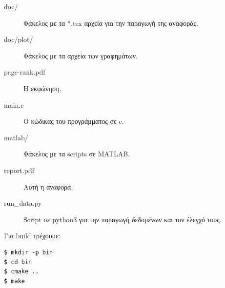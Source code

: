 \begin{description}
	\item[doc/] Φάκελος με τα *.tex αρχεία για την παραγωγή της αναφοράς.
	\item[doc/plot/] Φάκελος με τα αρχεία των γραφημάτων.
	\item[page-rank.pdf] Η εκφώνηση.
	\item[main.c] Ο κώδικας του προγράμματος σε c.
	\item[matlab/] Φάκελος με τα scripts σε MATLAB.
	\item[report.pdf] Αυτή η αναφορά.
	\item[run\_data.py] Script σε python3 για την παραγωγή δεδομένων και τον έλεγχό τους.
\end{description}

\noindent Για build τρέχουμε:
\begin{lstlisting}[style=Bash]
$ mkdir -p bin
$ cd bin
$ cmake ..
$ make
\end{lstlisting}





